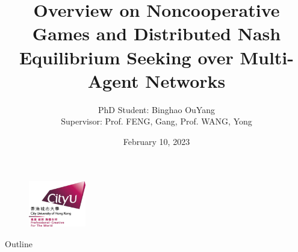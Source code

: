 \documentclass[table,CJK,mathserif,notheorem,10pt]{beamer}%
\title[My Title]{Overview on Noncooperative Games and Distributed Nash Equilibrium Seeking over Multi-Agent Networks}
\author[]{PhD Student: Binghao OuYang \\ \vspace{1em} Supervisor: Prof. FENG, Gang, Prof. WANG, Yong}
\institute[Department of Biomedical Engineering, City University of Hong Kong]{Department of Biomedical Engineering\\ City University of Hong Kong}
\date{\scriptsize{February 10, 2023}}
\begin{document}
\begin{CJK}{GBK}{kai}

\begin{frame}
\begin{figure}
\begin{center}
\includegraphics[height=2cm]{figure/cityu_logo2}
\end{center}                                 
\end{figure}
  \titlepage

\end{frame}


\begin{frame}{Outline}
  \tableofcontents
\end{frame}









\end{CJK}
\end{document}
